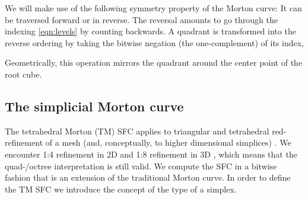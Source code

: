 \documentclass[a4paper,11pt]{article}
\newcommand{\eqnref}[1]{\eqref{eqn:#1}}
\newcommand{\seclab}[1]{\label{sec:#1}}
\begin{document}
We will make use of the following symmetry property of the Morton curve: It can
be traversed forward or in reverse.  The reversal amounts to go through the
indexing \eqnref{levels} by counting backwards.  A quadrant is transformed into
the reverse ordering by taking the bitwise negation (the one-complement) of its
index,

Geometrically, this operation mirrors the quadrant around the center point of
the root cube.

\subsection{The simplicial Morton curve}
\seclab{concepts-simplicial}

The tetrahedral Morton (TM) SFC applies to triangular and tetrahedral
red-refinement of a mesh (and, conceptually, to higher dimensional simplices)
\cite{BursteddeHolke16}.
We encounter 1:4 refinement in 2D and 1:8 refinement in 3D \cite{Bey92},
which means that the quad-/octree interpretation is still valid.
We compute the SFC in a bitwise fashion that is an extension of the
traditional Morton curve.
In order to define the TM SFC we introduce the concept of the type
of a simplex.
\end{document}

